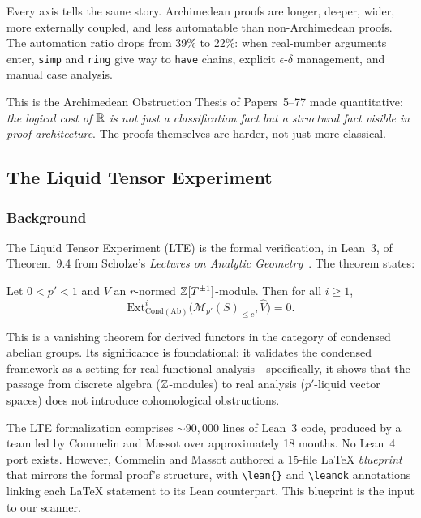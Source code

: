 Every axis tells the same story.  Archimedean proofs are longer, deeper,
wider, more externally coupled, and less automatable than non-Archimedean
proofs.  The automation ratio drops from 39\% to 22\%: when real-number
arguments enter, \texttt{simp} and \texttt{ring} give way to \texttt{have}
chains, explicit $\epsilon$-$\delta$ management, and manual case
analysis.

This is the Archimedean Obstruction Thesis of Papers~5--77 made
quantitative: \emph{the logical cost of $\mathbb{R}$ is not just a classification
fact but a structural fact visible in proof architecture}.  The proofs
themselves are harder, not just more classical.


\subsection{The Liquid Tensor Experiment}\label{part:lte}

\subsubsection{Background}\label{sec:lte-background}

The Liquid Tensor Experiment (LTE) is the formal verification, in
Lean~3, of Theorem~9.4 from Scholze's \emph{Lectures on Analytic
Geometry}~\cite{scholze-lte}.  The theorem states:

\begin{theorem}
Let $0 < p' < 1$ and $V$ an $r$-normed $\mathbb{Z}[T^{\pm 1}]$-module.
Then for all $i \geq 1$,
\[
  \mathrm{Ext}^i_{\mathrm{Cond}(\mathrm{Ab})}
  \bigl(\mathcal{M}_{p'}(S)_{\leq c}, \widehat{V}\bigr) = 0.
\]
\end{theorem}

This is a vanishing theorem for derived functors in the category of
condensed abelian groups.  Its significance is foundational: it
validates the condensed framework as a setting for real functional
analysis---specifically, it shows that the passage from discrete
algebra ($\mathbb{Z}$-modules) to real analysis ($p'$-liquid vector spaces)
does not introduce cohomological obstructions.

The LTE formalization comprises ${\sim}90{,}000$ lines of Lean~3
code, produced by a team led by Commelin and Massot over approximately
18 months.  No Lean~4 port exists.  However, Commelin and Massot
authored a 15-file LaTeX \emph{blueprint} that mirrors the formal
proof's structure, with \texttt{\textbackslash lean\{\}} and
\texttt{\textbackslash leanok} annotations linking each LaTeX
statement to its Lean counterpart.  This blueprint is the input to
our scanner.

